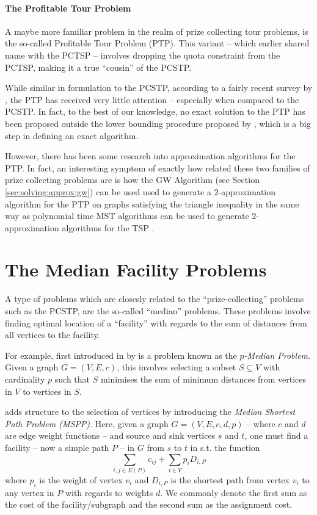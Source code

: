 \paragraph{The Profitable Tour Problem}
A maybe more familiar problem in the realm of prize collecting tour problems, is the
so-called Profitable Tour Problem (PTP). This variant -- which earlier shared name with
the PCTSP -- involves dropping the quota constraint from the PCTSP, making it a true
 ``cousin'' of the PCSTP.

 While similar in formulation to the PCSTP, according to a fairly recent survey by
 \citet{archetti2014chapter}, the PTP has received very little attention -- 
 especially when compared to the PCSTP.
 In fact, to the best of our knowledge, no exact solution to the PTP
 has been proposed outside the lower bounding procedure proposed by \citet{dell1995prize},
  which is a big step in defining an exact algorithm.
 
 However, there has been some research into approximation algorithms for the PTP.
 In fact, an interesting symptom of exactly how related these two families of
 prize collecting problems are
is how the GW Algorithm (see Section \ref{sec:solving:approx:gw})
can be used used to generate a 2-approximation algorithm for the PTP
on graphs satisfying the triangle inequality in the same way as
polynomial time MST algorithms can be used to generate 2-approximation algorithms
for the TSP \citep{goemans1995general}.



 \section{The Median Facility Problems}
 A type of problems which are closesly related to the ``prize-collecting'' problems such as the PCSTP, are the so-called
 ``median'' problems. These problems involve finding optimal location of a ``facility'' with regards to the sum
 of distances from all vertices to the facility.

 For example, first introduced in \citeyear{hakimi1964optimum} by \citet{hakimi1964optimum} is a problem known as
 the \textit{$p$-Median Problem}. Given a graph $G = (V, E, c)$, this involves selecting a subset $S \subseteq V$ with
 cardinality $p$ such that $S$ minimises the sum of minimum distances from vertices in $V$ to vertices in $S$.
 
 \citet{current1987median} adds structure to the selection of vertices by introducing the \textit{Median Shortest Path Problem (MSPP)}.
 Here, given a graph $G = (V,E,c,d,p)$ -- where $c$ and $d$ are edge weight functions --
 and source and sink vertices $s$ and $t$, one must find a facility
  -- now a simple path $P$ --  in $G$
 from $s$ to $t$ in s.t. the function
 $$\sum_{i,j \in E(P)} c_{ij} + \sum_{i \in V} p_i D_{i, P}$$
 where $p_i$ is the weight of vertex $v_i$ and
 $D_{i, P}$ is the shortest path from vertex $v_i$ to any vertex in $P$ with regards to
 weights $d$.
 We commonly denote the first sum as the cost of the facility/subgraph and the second sum as the assignment cost.

